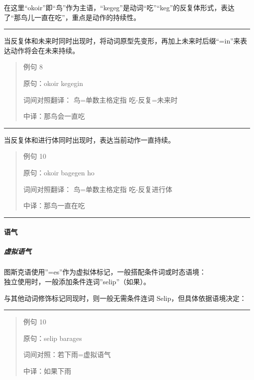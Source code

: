 \documentclass{article}
\begin{document}
在这里``okoir''即``鸟''作为主语，``kegeg''是动词``吃''``keg''的反复体形式，表达了``那鸟儿一直在吃''，重点是动作的持续性。

\begin{center}\rule{0.5\linewidth}{0.5pt}\end{center}

当反复体和未来时同时出现时，将动词原型先变形，再加上未来时后缀``=in''来表达动作将会在未来持续。

\begin{quote}
例句 8

原句：okoir kegegin

词间对照翻译： 鸟=单数主格定指 吃-反复=未来时

中译：那鸟会一直吃
\end{quote}

\begin{center}\rule{0.5\linewidth}{0.5pt}\end{center}

当反复体和进行体同时出现时，表达当前动作一直持续。

\begin{quote}
例句 10

原句：okoir bagegen ho

词间对照翻译： 鸟=单数主格定指 吃-反复进行体

中译：那鸟一直在吃
\end{quote}

\begin{center}\rule{0.5\linewidth}{0.5pt}\end{center}

\paragraph{语气}\label{ux8bedux6c14}

\subparagraph{虚拟语气}\label{ux865aux62dfux8bedux6c14}

图斯克语使用''=es''作为虚拟体标记，一般搭配条件词或时态语境：\\
独立使用时，一般添加条件连词''selip''（如果）。

与其他动词修饰标记同现时，则一般无需条件连词 Selip，但具体依据语境决定：

\begin{center}\rule{0.5\linewidth}{0.5pt}\end{center}

\begin{quote}
例句 10

原句：selip barages

词间对照：若下雨=虚拟语气

中译：如果下雨
\end{quote}
\end{document}
